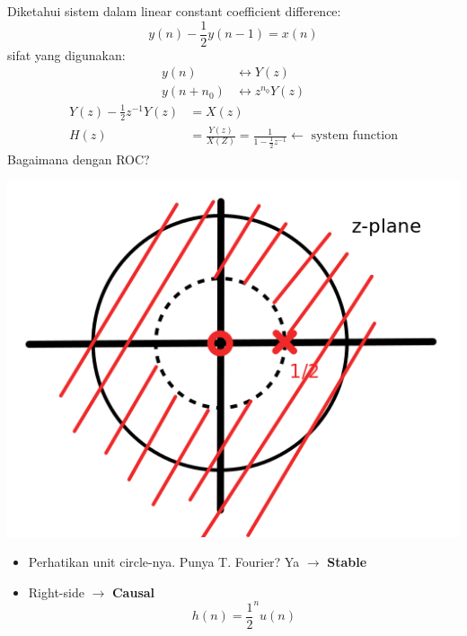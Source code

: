 \documentclass[pdflatex,compress,mathserif]{beamer}
\begin{document}
\begin{frame}
	Diketahui sistem dalam linear constant coefficient difference:
	\[ y(n) - \frac{1}{2} y(n-1) = x(n) \]
	sifat yang digunakan:
	\begin{align*}
		y(n) &\leftrightarrow Y(z) \\
		y(n+n_0) &\leftrightarrow z^{n_0}Y(z)
	\end{align*}
	\begin{align*}
		Y(z) - \frac{1}{2}z^{-1}Y(z) &= X(z) \\
		H(z) &= \frac{Y(z)}{X(Z)} = \frac{1}{1 - \frac{1}{2}z^{-1}} \leftarrow \text{ system function}
	\end{align*}
	Bagaimana dengan ROC?
\end{frame}

\begin{frame}
	\begin{multicols}{2}
		\begin{center}
			\includegraphics[width=\linewidth]{img/img04}
		\end{center}
	\columnbreak
	\begin{itemize}
		\item Perhatikan unit circle-nya. Punya T. Fourier? Ya $\rightarrow$ \textbf{Stable}
		\item Right-side $\rightarrow$ \textbf{Causal}
		\[ h(n) = \frac{1}{2}^n u(n) \]
	\end{itemize}
	\end{multicols}
\end{frame}
\end{document}
